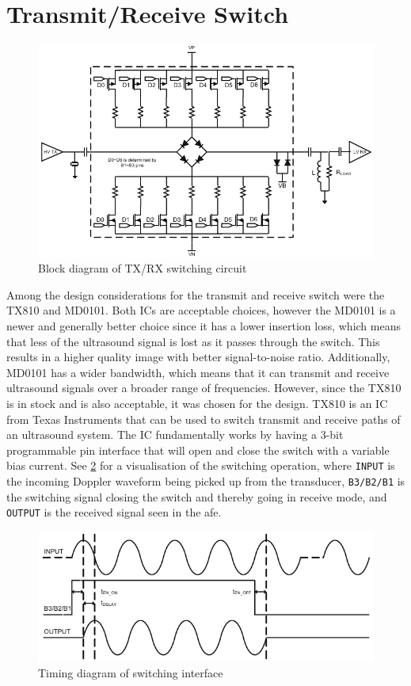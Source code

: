 \section{Transmit/Receive Switch}
\begin{figure}[htbp]
	\centering
	\includegraphics[width=.8\textwidth]{Figures/3_switch_tx810_block.pdf}
	\caption{Block diagram of TX/RX switching circuit \cite{TX810}}
	\label{fig:3_switch}
\end{figure}
Among the design considerations for the transmit and receive switch were the TX810\cite{TX810} and MD0101\cite{MD0101}. Both ICs are acceptable choices, however the MD0101 is a newer and generally better choice since it has a lower insertion loss, which means that less of the ultrasound signal is lost as it passes through the switch. This results in a higher quality image with better signal-to-noise ratio. Additionally, MD0101 has a wider bandwidth, which means that it can transmit and receive ultrasound signals over a broader range of frequencies. However, since the TX810 is in stock and is also acceptable, it was chosen for the design. TX810 is an IC from Texas Instruments that can be used to switch transmit and receive paths of an ultrasound system. The IC fundamentally works by having a 3-bit programmable pin interface that will open and close the switch with a variable bias current. See \cref{fig:3_tx810_timing} for a visualisation of the switching operation, where \texttt{INPUT} is the incoming Doppler waveform being picked up from the transducer, \texttt{B3/B2/B1} is the switching signal closing the switch and thereby going in receive mode, and \texttt{OUTPUT} is the received signal seen in the \gls{afe}.
\begin{figure}[htbp]
	\centering
	\includegraphics[width=.8\textwidth]{Figures/3_tx810_timing.pdf}
	\caption{Timing diagram of switching interface\cite{TX810}}
	\label{fig:3_tx810_timing}
\end{figure}

